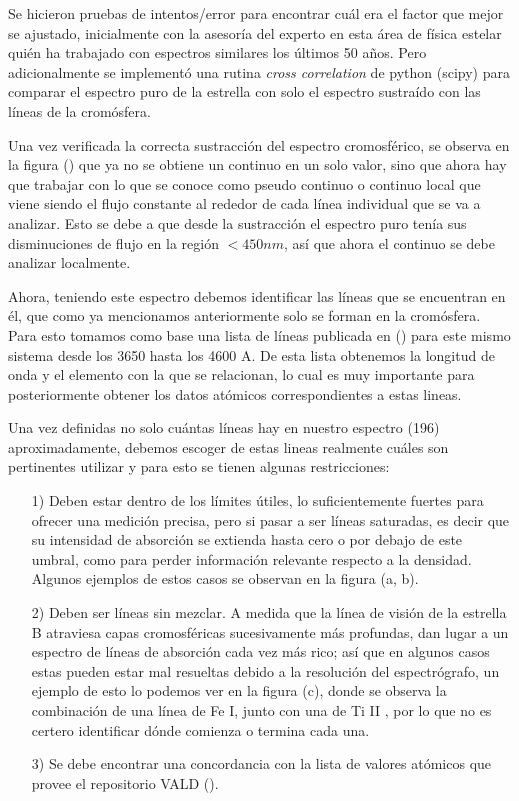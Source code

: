 \documentclass[12pt,oneside,openany,letter]{book}
\begin{document}
Se hicieron pruebas de intentos/error para encontrar cuál era el factor que mejor se ajustado, inicialmente con la asesoría del experto en esta área de física estelar quién ha trabajado con espectros similares los últimos 50 años. Pero adicionalmente se implementó una rutina \textit{cross correlation} de python (scipy) para comparar el espectro puro de la estrella con solo el espectro sustraído con las líneas de la cromósfera.

Una vez verificada la correcta sustracción del espectro cromosférico, se observa en la figura () que ya no se obtiene un continuo en un solo valor, sino que ahora hay que trabajar con lo que se conoce como pseudo continuo o continuo local que viene siendo el flujo constante al rededor de cada línea individual que se va a analizar. Esto se debe a que desde la sustracción el espectro puro tenía sus disminuciones de flujo en la región $< 450 nm $, así que ahora el continuo se debe analizar localmente.




Ahora, teniendo este espectro debemos identificar las líneas que se encuentran en él, que como ya mencionamos anteriormente solo se forman en la cromósfera. Para esto tomamos como base una lista de líneas publicada en () para este mismo sistema desde los 3650 hasta los 4600 A. De esta lista obtenemos la longitud de onda y el elemento con la que se relacionan, lo cual es muy importante para posteriormente obtener los datos atómicos correspondientes a estas lineas.

Una vez definidas no solo cuántas líneas hay en nuestro espectro (196) aproximadamente, debemos escoger de estas lineas realmente cuáles son pertinentes utilizar y para esto se tienen algunas restricciones: 
\begin{itemize}
    \item[1)] Deben estar dentro de los límites útiles, lo suficientemente fuertes para ofrecer una medición precisa, pero si pasar a ser líneas saturadas, es decir que su intensidad de absorción se extienda hasta cero o por debajo de este umbral,  como para perder información relevante respecto a la densidad. Algunos ejemplos de estos casos se observan en la figura (a, b). 
    \item[2)] Deben ser líneas sin mezclar. A medida que la línea de visión de la estrella B atraviesa capas cromosféricas sucesivamente más profundas, dan lugar a un espectro de líneas de absorción cada vez más rico; así que en algunos casos estas pueden estar mal resueltas debido a la resolución del espectrógrafo, un ejemplo de esto lo podemos ver en la figura (c), donde se observa la combinación de una línea de Fe I, junto con una de Ti II , por lo que no es certero identificar dónde comienza o termina cada una.
    \item[3)] Se debe encontrar una concordancia con la lista de valores atómicos que provee el repositorio VALD ().
\end{itemize}
\end{document}
